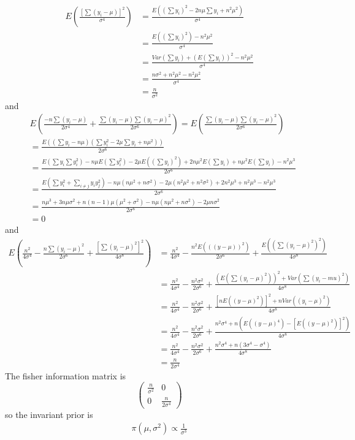 \documentclass[11pt]{article}
\begin{document}
\[\begin{align}
    E\left(\frac{[\sum(y_i-\mu)]^2}{\sigma^4}\right)&= \frac{E\left((\sum y_i)^2-2n\mu\sum y_i+n^2\mu^2\right)}{\sigma^4} \\
    &= \frac{E((\sum y_i)^2)-n^2\mu^2}{\sigma^4} \\
    &= \frac{Var(\sum y_i)+(E(\sum y_i))^2-n^2\mu^2}{\sigma^4} \\
    &= \frac{n\sigma^2+n^2\mu^2-n^2\mu^2}{\sigma^4} \\
    &= \frac{n}{\sigma^2}
\end{align}\] and \[\begin{align}
    &E\left(\frac{-n\sum(y_i-\mu)}{2\sigma^4} + \frac{\sum(y_i-\mu)\sum(y_i-\mu)^2}{2\sigma^6}\right) = E\left( \frac{\sum(y_i-\mu)\sum(y_i-\mu)^2}{2\sigma^6}\right) \\
    &= \frac{E\left((\sum y_i-n\mu)(\sum y_i^2-2\mu\sum y_i+n\mu^2)\right)}{2\sigma^6} \\
    &= \frac{E(\sum y_i\sum y_i^2) -n\mu E(\sum y_i^2) -2\mu E((\sum y_i)^2)+2n\mu^2E(\sum y_i)+n\mu^2E(\sum y_i)-n^2\mu^3}{2\sigma^6} \\
    &= \frac{E(\sum y_i^2+\sum_{i\neq j}y_iy_j^2) - n\mu(n\mu^2+n\sigma^2)-2\mu(n^2\mu^2+n^2\sigma^2)+2n^2\mu^3+n^2\mu^3-n^2\mu^3}{2\sigma^6} \\
    &= \frac{n\mu^3+3n\mu\sigma^2+n(n-1)\mu(\mu^2+\sigma^2)- n\mu(n\mu^2+n\sigma^2)-2\mu n\sigma^2}{2\sigma^6} \\
    &= 0
\end{align}\] and \[\begin{align}
    E(\frac{n^2}{4\sigma^4}-\frac{n\sum(y_i-\mu)^2}{2\sigma^6} + \frac{[\sum(y_i-\mu)^2]^2}{4\sigma^8}) &= \frac{n^2}{4\sigma^4} - \frac{n^2E(((y-\mu))^2)}{2\sigma^6} + \frac{E((\sum(y_i-\mu)^2)^2)}{4\sigma^8} \\
    &= \frac{n^2}{4\sigma^4} - \frac{n^2\sigma^2}{2\sigma^6} + \frac{(E(\sum (y_i-\mu)^2))^2+Var(\sum (y_i-mu)^2)}{4\sigma^8} \\
    &= \frac{n^2}{4\sigma^4} - \frac{n^2\sigma^2}{2\sigma^6} + \frac{\left[nE((y-\mu)^2)\right]^2+nVar((y_i-\mu)^2)}{4\sigma^8} \\
    &= \frac{n^2}{4\sigma^4} - \frac{n^2\sigma^2}{2\sigma^6} + \frac{n^2\sigma^4+n\left(E((y-\mu)^4)-[E((y-\mu)^2)]^2\right)}{4\sigma^8} \\
    &= \frac{n^2}{4\sigma^4} - \frac{n^2\sigma^2}{2\sigma^6} + \frac{n^2\sigma^4+n(3\sigma^4-\sigma^4)}{4\sigma^8} \\
    &= \frac{n}{2\sigma^4}
\end{align}\] The fisher information matrix is
\[\left( \begin{array}{ccc}
    \frac{n}{\sigma^2} & 0 \\
    0 &  \frac{n}{2\sigma^4}
\end{array}\right)\] so the invariant prior is \[\begin{align}
    \pi(\mu, \sigma^2)\propto \frac{1}{\sigma^3}
\end{align}\]
\end{document}
